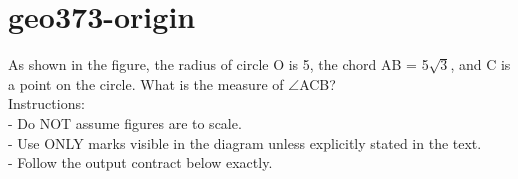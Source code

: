 \documentclass[12pt]{article}
\begin{document}
\section*{geo373-origin}
\noindent\begin{minipage}{\textwidth}
\setlength{\parskip}{4pt}
As shown in the figure, the radius of circle O is 5, the chord AB = 5\ensuremath{\sqrt{3}}, and C is a point on the circle. What is the measure of \ensuremath{\angle }ACB?\\
Instructions:\\
- Do NOT assume figures are to scale.\\
- Use ONLY marks visible in the diagram unless explicitly stated in the text.\\
- Follow the output contract below exactly.\\
\end{minipage}
\end{document}
